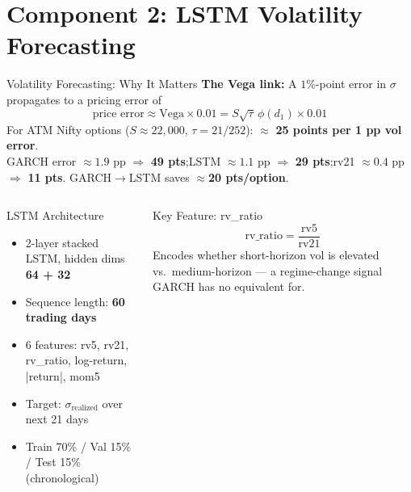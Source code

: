 \documentclass[aspectratio=169,10pt]{beamer}
\begin{document}
\section{Component 2: LSTM Volatility Forecasting}

\begin{frame}{Volatility Forecasting: Why It Matters}
\textbf{The Vega link:} A $1\%$-point error in $\sigma$ propagates to a pricing error of
\[
  \text{price error} \approx \text{Vega} \times 0.01 = S\sqrt{\tau}\,\phi(d_1) \times 0.01
\]
For ATM Nifty options ($S\!\approx\!22{,}000$, $\tau=21/252$): $\approx$ \textbf{25 points per 1 pp vol error}.\\[0.3em]
{\small GARCH error $\approx1.9$ pp $\Rightarrow$ \textbf{49 pts};\quad LSTM $\approx1.1$ pp $\Rightarrow$ \textbf{29 pts};\quad rv21 $\approx0.4$ pp $\Rightarrow$ \textbf{11 pts}. GARCH$\to$LSTM saves $\approx$\textbf{20 pts/option}.}

\medskip
\begin{columns}[T]
\begin{block}{LSTM Architecture}
\begin{itemize}\itemsep2pt
  \item 2-layer stacked LSTM, hidden dims \textbf{64 + 32}
  \item Sequence length: \textbf{60 trading days}
  \item 6 features: rv5, rv21, rv\_ratio, log-return, |return|, mom5
  \item Target: $\sigma_{\text{realized}}$ over next 21 days
  \item Train 70\% / Val 15\% / Test 15\% (chronological)
\end{itemize}
\end{block}

\begin{block}{Key Feature: rv\_ratio}
\[
  \text{rv\_ratio} = \frac{\text{rv5}}{\text{rv21}}
\]
Encodes whether short-horizon vol is elevated vs.\ medium-horizon — a regime-change signal GARCH has no equivalent for.
\end{block}
\end{columns}
\end{frame}
\end{document}
